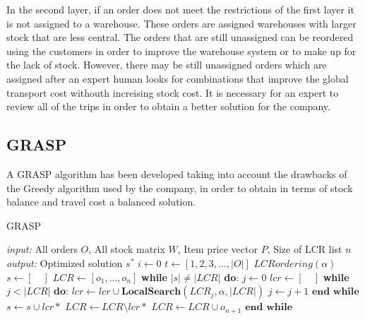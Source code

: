 \documentclass[letterpaper]{article} %
\begin{document}
In the second layer, if an order does not meet the restrictions of the first layer it is not assigned to a warehouse. These orders are assigned warehouses with larger stock that are less central. The orders that are still unassigned can be reordered using the customers in order to improve the warehouse system or to make up for the lack of stock. However, there may be still unassigned orders which are assigned after an expert human looks for combinations that improve the global transport cost withouth increising stock cost.
It is necessary for an expert to review all of the trips in order to obtain a better solution for the company.

\subsection*{GRASP}

A GRASP algorithm has been developed taking into account the drawbacks of the Greedy algorithm used by the company, in order to obtain in terms of stock balance and travel cost a balanced solution. 

\begin{algorithm}[H]
    \caption{GRASP}
    \label{alg:GRASP}
    \begin{algorithmic}[1] \label{code:grasp}
        \STATE \textit{input: } All orders $O$, All stock matrix $W$, Item price vector $P$, Size of LCR list $n$
        \STATE \textit{output: } Optimized solution $s^*$
        \STATE $i \longleftarrow 0 $
        \STATE $ t \longleftarrow [1,2,3,\dots,|O|]$
        \STATE $LCRordering(\alpha)$\label{LCRordering}
        \STATE
        \STATE $s \longleftarrow [\quad] $
        \STATE $LCR \longleftarrow [o_1,\dots,o_n]$
        \STATE \textbf{while } $|s| \neq |LCR|$ \textbf{do}:\label{1grasp}
        \STATE \quad $j \longleftarrow 0 $
        \STATE \quad $lcr \longleftarrow [\quad]$
        \STATE \quad \textbf{while } $j < |LCR|$ \textbf{do}:
        \STATE \quad \quad $lcr \longleftarrow lcr \cup \textbf{LocalSearch}(LCR_j,\alpha,|LCR|)$
        \STATE \quad \quad $j \longleftarrow j + 1$
        \STATE \quad $\textbf{end while}$
        \STATE \quad $s \longleftarrow s \cup lcr*$ 
        \STATE \quad $LCR \longleftarrow LCR \setminus lcr*$ 
        \STATE \quad $LCR \longleftarrow LCR \cup  o_{n+1} $ 
        \STATE $\textbf{end while}$\label{2grasp}
    \end{algorithmic}
\end{algorithm}
\end{document}
